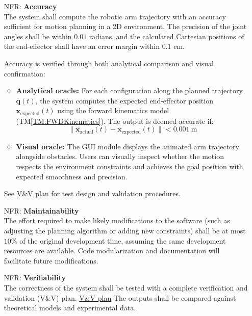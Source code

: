 \documentclass[12pt]{article}
\newcommand{\tref}[1]{TM\ref{#1}}
\newcounter{nfrnum} %
\begin{document}
  \noindent \begin{itemize}
  
  \item[NFR\refstepcounter{nfrnum}\thenfrnum \label{NFR_Accuracy}:]  
  \textbf{Accuracy} \\
The system shall compute the robotic arm trajectory with an accuracy sufficient for motion planning in a 2D environment. The precision of the joint angles shall be within \(0.01\) radians, and the calculated Cartesian positions of the end-effector shall have an error margin within \(0.1\) cm. 

Accuracy is verified through both analytical comparison and visual confirmation:

\begin{itemize}
  \item \textbf{Analytical oracle:} For each configuration along the planned trajectory \(\mathbf{q}(t)\), the system computes the expected end-effector position \(\mathbf{x}_{\text{expected}}(t)\) using the forward kinematics model (\tref{TM:FWDKinematics}). The output is deemed accurate if:
  \[
  \|\mathbf{x}_{\text{actual}}(t) - \mathbf{x}_{\text{expected}}(t)\| < 0.001~\text{m}
  \]
  \item \textbf{Visual oracle:} The GUI module displays the animated arm trajectory alongside obstacles. Users can visually inspect whether the motion respects the environment constraints and achieves the goal position with expected smoothness and precision.
\end{itemize}

See \href{https://github.com/FangZiyang/CAS741-Ryan/blob/main/docs/VnVPlan/VnVPlan.pdf}{V\&V plan} for test design and validation procedures.

  
  \item[NFR\refstepcounter{nfrnum}\thenfrnum \label{NFR_Maintainability}:]  
    \textbf{Maintainability} \\
    The effort required to make likely modifications to the software (such as adjusting the planning algorithm or adding new constraints) shall be at most \(10\%\) of the original development time, assuming the same development resources are available. Code modularization and documentation will facilitate future modifications.

  \item[NFR\refstepcounter{nfrnum}\thenfrnum \label{NFR_Verifiability}:]  
    \textbf{Verifiability} \\
    The correctness of the system shall be tested with a complete verification and validation (V\&V) plan. \href{https://github.com/FangZiyang/CAS741-Ryan/blob/main/docs/VnVPlan/VnVPlan.pdf}{V\&V plan} The outputs shall be compared against theoretical models and experimental data.
  

\end{itemize}
\end{document}
